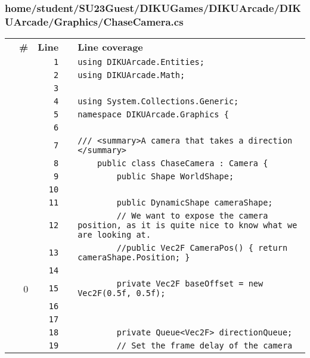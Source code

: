 \documentclass[a4paper,landscape,10pt]{article}
\begin{document}
\subsubsection{home/student/SU23Guest/DIKUGames/DIKUArcade/DIKUArcade/Graphics/ChaseCamera.cs}
\begin{longtable}[l]{lrrll}
\textbf{} & \textbf{\#} & \textbf{Line} & \textbf{} & \textbf{Line coverage}\\
\cellcolor{gray} &  & \verb~1~ & & \verb~using DIKUArcade.Entities;~\\
\cellcolor{gray} &  & \verb~2~ & & \verb~using DIKUArcade.Math;~\\
\cellcolor{gray} &  & \verb~3~ & & \verb~~\\
\cellcolor{gray} &  & \verb~4~ & & \verb~using System.Collections.Generic;~\\
\cellcolor{gray} &  & \verb~5~ & & \verb~namespace DIKUArcade.Graphics {~\\
\cellcolor{gray} &  & \verb~6~ & & \verb~~\\
\cellcolor{gray} &  & \verb~7~ & & \verb~/// <summary>A camera that takes a direction </summary>~\\
\cellcolor{gray} &  & \verb~8~ & & \verb~    public class ChaseCamera : Camera {~\\
\cellcolor{gray} &  & \verb~9~ & & \verb~        public Shape WorldShape;~\\
\cellcolor{gray} &  & \verb~10~ & & \verb~~\\
\cellcolor{gray} &  & \verb~11~ & & \verb~        public DynamicShape cameraShape;~\\
\cellcolor{gray} &  & \verb~12~ & & \verb~        // We want to expose the camera position, as it is quite nice to know what we are looking at.~\\
\cellcolor{gray} &  & \verb~13~ & & \verb~        //public Vec2F CameraPos() { return cameraShape.Position; }~\\
\cellcolor{gray} &  & \verb~14~ & & \verb~~\\
\cellcolor{red} & 0 & \verb~15~ & & \verb~        private Vec2F baseOffset = new Vec2F(0.5f, 0.5f);~\\
\cellcolor{gray} &  & \verb~16~ & & \verb~~\\
\cellcolor{gray} &  & \verb~17~ & & \verb~~\\
\cellcolor{gray} &  & \verb~18~ & & \verb~        private Queue<Vec2F> directionQueue;~\\
\cellcolor{gray} &  & \verb~19~ & & \verb~        // Set the frame delay of the camera~\\

\end{longtable}
\end{document}
